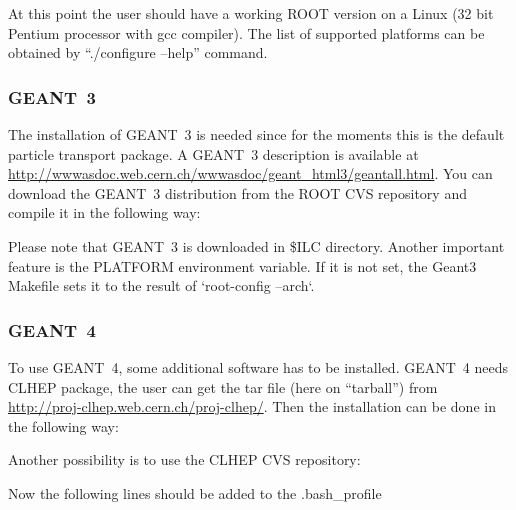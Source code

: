 \documentclass[12pt,a4paper,twoside]{article}
\begin{document}
At this point the user should have a working ROOT version on a Linux
(32 bit Pentium processor with gcc compiler). The list of supported
platforms can be obtained by ``./configure --help'' command.

\subsubsection{GEANT~3}

The installation of GEANT~3 is needed since for the moments this is
the default particle transport package. A GEANT~3 description is
available at 
\url{http://wwwasdoc.web.cern.ch/wwwasdoc/geant_html3/geantall.html}.
You can download the GEANT~3 distribution from the ROOT CVS repository
and compile it in the following way:



Please note  that GEANT~3 is downloaded in  \$ILC directory. Another
important feature is  the PLATFORM environment variable. If  it is not
set,  the  Geant3 Makefile  sets  it  to  the result  of  `root-config
--arch`.

\subsubsection{GEANT~4}
To use GEANT~4\cite{Geant4}, some additional software has to
be installed. GEANT~4 needs CLHEP\cite{CLHEP} package, the user can
get the tar file (here on ``tarball'') from
\url{http://proj-clhep.web.cern.ch/proj-clhep/}.
 Then the installation can be done in the following way:




Another possibility is to use the CLHEP CVS repository:



Now the following lines should be added to the .bash\_profile

\begin{lstlisting}[language=sh]
  % export CLHEP_BASE_DIR=$ILC/CLHEP
\end{lstlisting} 
\end{document}
